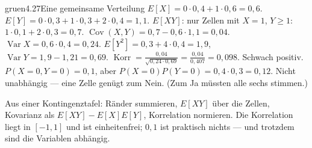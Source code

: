 \begin{loesungkarte}{gruen}{4.27}{Eine gemeinsame Verteilung}
$E[X] = 0\cdot0{,}4 + 1\cdot0{,}6 = 0{,}6$. $E[Y] = 0\cdot0{,}3 + 1\cdot0{,}3 + 2\cdot0{,}4 = 1{,}1$. $E[XY]$: nur Zellen mit $X = 1$, $Y\ge1$: $1\cdot0{,}1 + 2\cdot0{,}3 = 0{,}7$.
$\operatorname{Cov}(X, Y) = 0{,}7 - 0{,}6\cdot1{,}1 = 0{,}04$.
$\operatorname{Var}X = 0{,}6\cdot0{,}4 = 0{,}24$. $E[Y^{2}] = 0{,}3 + 4\cdot0{,}4 = 1{,}9$, $\operatorname{Var}Y = 1{,}9 - 1{,}21 = 0{,}69$. $\operatorname{Korr} = \frac{0{,}04}{\sqrt{0{,}24\cdot0{,}69}} = \frac{0{,}04}{0{,}407} = 0{,}098$. Schwach positiv.
$P(X = 0, Y = 0) = 0{,}1$, aber $P(X = 0)P(Y = 0) = 0{,}4\cdot0{,}3 = 0{,}12$. Nicht unabhängig --- eine Zelle genügt zum Nein. (Zum Ja müssten alle sechs stimmen.)
\begin{mitnehmen}\kastentext
Aus einer Kontingenztafel: Ränder summieren, $E[XY]$ über die Zellen, Kovarianz als $E[XY] - E[X]E[Y]$, Korrelation normieren. Die Korrelation liegt in $[-1, 1]$ und ist einheitenfrei; $0{,}1$ ist praktisch nichts --- und trotzdem sind die Variablen abhängig.
\end{mitnehmen}
\end{loesungkarte}

